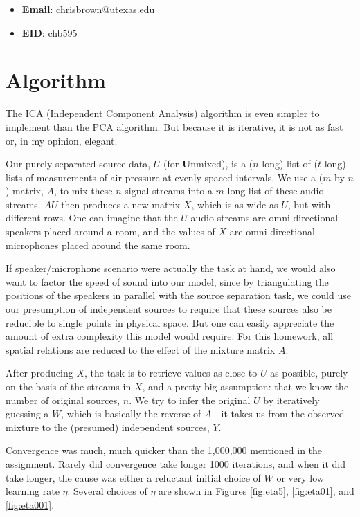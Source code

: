 \documentclass[11pt]{report}
\begin{document}
\begin{itemize}
  \item \textbf{Email}: chrisbrown@utexas.edu
  \item \textbf{EID}: chb595
\end{itemize}

\section{Algorithm}

The ICA (Independent Component Analysis) algorithm is even simpler to implement than the PCA algorithm. But because it is iterative, it is not as fast or, in my opinion, elegant.

Our purely separated source data, $U$ (for \textbf{U}nmixed), is a ($n$-long) list of ($t$-long) lists of measurements of air pressure at evenly spaced intervals. We use a ($m$ by $n$) matrix, $A$, to mix these $n$ signal streams into a $m$-long list of these audio streams. $AU$ then produces a new matrix $X$, which is as wide as $U$, but with different rows. One can imagine that the $U$ audio streams are omni-directional speakers placed around a room, and the values of $X$ are omni-directional microphones placed around the same room.

If speaker/microphone scenario were actually the task at hand, we would also want to factor the speed of sound into our model, since by triangulating the positions of the speakers in parallel with the source separation task, we could use our presumption of independent sources to require that these sources also be reducible to single points in physical space. But one can easily appreciate the amount of extra complexity this model would require. For this homework, all spatial relations are reduced to the effect of the mixture matrix $A$.

After producing $X$, the task is to retrieve values as close to $U$ as possible, purely on the basis of the streams in $X$, and a pretty big assumption: that we know the number of original sources, $n$. We try to infer the original $U$ by iteratively guessing a $W$, which is basically the reverse of $A$---it takes us from the observed mixture to the (presumed) independent sources, $Y$.

Convergence was much, much quicker than the 1,000,000 mentioned in the assignment. Rarely did convergence take longer 1000 iterations, and when it did take longer, the cause was either a reluctant initial choice of $W$ or very low learning rate $\eta$. Several choices of $\eta$ are shown in Figures \ref{fig:eta5}, \ref{fig:eta01}, and \ref{fig:eta001}.
\end{document}
